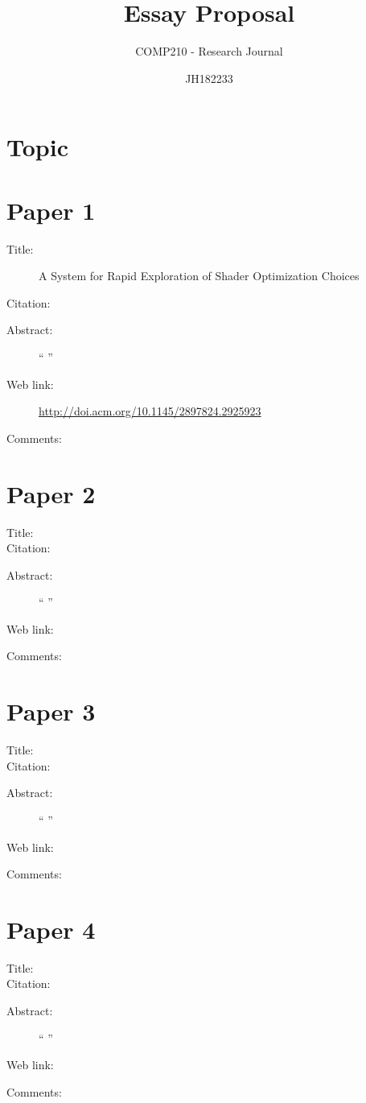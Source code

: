 \documentclass{scrartcl}
\title{Essay Proposal}
\subtitle{COMP210 - Research Journal}
\author{JH182233}
\begin{document}
	
	
	\maketitle
	\section*{Topic}
	
	
	\section*{Paper 1}
	\begin{description}
		\item[Title:]A System for Rapid Exploration of Shader Optimization Choices
		\item[Citation:] \cite{He}
		\item[Abstract:] ``
		''
		\item[Web link:] \url{http://doi.acm.org/10.1145/2897824.2925923}
		\item[Comments:]
	\end{description}
	
	\section*{Paper 2}
	\begin{description}
		\item[Title:]
		\item[Citation:] \cite{}
		\item[Abstract:] ``
		''
		\item[Web link:] \url{}
		\item[Comments:]
	\end{description}
	
	\section*{Paper 3}
	\begin{description}
		\item[Title:]
		\item[Citation:] \cite{}
		\item[Abstract:] ``
		''
		\item[Web link:] \url{}
		\item[Comments:]
	\end{description}
	
	\section*{Paper 4}
	\begin{description}
		\item[Title:]
		\item[Citation:] \cite{}
		\item[Abstract:] ``
		''
		\item[Web link:] \url{}
		\item[Comments:]
	\end{description}
	
\end{document}
